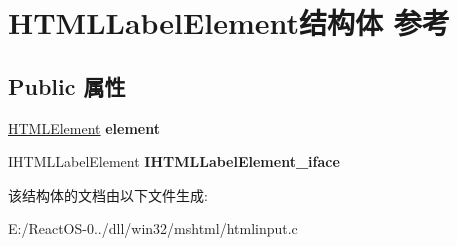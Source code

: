 \hypertarget{struct_h_t_m_l_label_element}{}\section{H\+T\+M\+L\+Label\+Element结构体 参考}
\label{struct_h_t_m_l_label_element}
\subsection*{Public 属性}
\begin{DoxyCompactItemize}
\item 
\mbox{\label{struct_h_t_m_l_label_element_a70451804bc3f419f62bb2816b2a5b9a9}} 
\hyperlink{struct_h_t_m_l_element}{H\+T\+M\+L\+Element} {\bfseries element}
\item 
\mbox{\label{struct_h_t_m_l_label_element_a4ddb1b7fb4d09369e89e75d91a0839c5}} 
I\+H\+T\+M\+L\+Label\+Element {\bfseries I\+H\+T\+M\+L\+Label\+Element\+\_\+iface}
\end{DoxyCompactItemize}


该结构体的文档由以下文件生成\+:\begin{DoxyCompactItemize}
\item 
E\+:/\+React\+O\+S-\/0../dll/win32/mshtml/htmlinput.\+c\end{DoxyCompactItemize}

